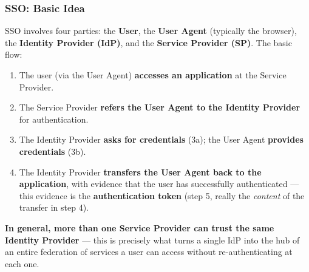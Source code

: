 \documentclass[12pt, a4paper]{article}
\begin{document}
\subsubsection{SSO: Basic Idea}
\label{subsec:sso-basic-06}
SSO involves four parties: the \textbf{User}, the \textbf{User Agent} (typically the browser), the \textbf{Identity Provider (IdP)}, and the \textbf{Service Provider (SP)}. The basic flow:
\begin{enumerate}
    \item The user (via the User Agent) \textbf{accesses an application} at the Service Provider.
    \item The Service Provider \textbf{refers the User Agent to the Identity Provider} for authentication.
    \item The Identity Provider \textbf{asks for credentials} (3a); the User Agent \textbf{provides credentials} (3b).
    \item The Identity Provider \textbf{transfers the User Agent back to the application}, with evidence that the user has successfully authenticated --- this evidence is the \textbf{authentication token} (step 5, really the \emph{content} of the transfer in step 4).
\end{enumerate}
\textcolor{blue!50!black}{\textbf{In general, more than one Service Provider can trust the same Identity Provider}} --- this is precisely what turns a single IdP into the hub of an entire federation of services a user can access without re-authenticating at each one.
\end{document}
